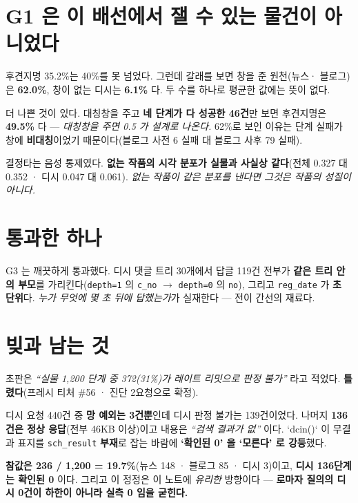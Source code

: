 \documentclass[10pt]{article}
\begin{document}
\section{G1 은 이 배선에서 잴 수 있는 물건이 아니었다}

후견지명 35.2\%는 40\%를 못 넘었다. 그런데 갈래를 보면 창을 준 원천(뉴스·
블로그)은 \textbf{62.0\%}, 창이 없는 디시는 \textbf{6.1\%} 다. 두 수를 하나로
평균한 값에는 뜻이 없다.

더 나쁜 것이 있다. 대칭창을 주고 \textbf{네 단계가 다 성공한 46건}만 보면
후견지명은 \textbf{49.5\%} 다 --- \emph{대칭창을 주면 0.5 가 설계로 나온다.}
62\%로 보인 이유는 단계 실패가 창에 \textbf{비대칭}이었기 때문이다(블로그
사전 6 실패 대 블로그 사후 79 실패).

결정타는 음성 통제였다. \textbf{없는 작품의 시각 분포가 실물과 사실상
같다}(전체 0.327 대 0.352 · 디시 0.047 대 0.061). \emph{없는 작품이 같은
분포를 낸다면 그것은 작품의 성질이 아니다.}


\section{통과한 하나}

G3 는 깨끗하게 통과했다. 디시 댓글 트리 30개에서 답글 119건 전부가
\textbf{같은 트리 안의 부모}를 가리킨다(\texttt{depth=1} 의 \texttt{c\_no} $\to$
\texttt{depth=0} 의 \texttt{no}), 그리고 \texttt{reg\_date} 가 \textbf{초
단위}다. \emph{누가 무엇에 몇 초 뒤에 답했는가}가 실재한다 --- 전이 간선의
재료다.

\section{빚과 남는 것}

초판은 \emph{``실물 1,200 단계 중 372(31\%)가 레이트 리밋으로 판정 불가''} 라고
적었다. \textbf{틀렸다}(프레시 티처 \#56 · 진단 2요청으로 확정).

디시 요청 440건 중 \textbf{망 예외는 3건뿐}인데 디시 판정 불가는 139건이었다.
나머지 \textbf{136건은 정상 응답}(전부 46KB 이상)이고 내용은 \emph{``검색 결과가
없''} 이다. `dcin()` 이 무결과 표지를 \texttt{sch\_result} \textbf{부재}로 잡는
바람에 \textbf{`확인된 0' 을 `모른다' 로 강등}했다.

\textbf{참값은 236 / 1,200 = 19.7\%}(뉴스 148 · 블로그 85 · 디시 3)이고,
\textbf{디시 136단계는 확인된 0} 이다. 그리고 이 정정은 이 노트에
\emph{유리한} 방향이다 --- \textbf{로마자 질의의 디시 0건이 하한이 아니라
실측 0 임을 굳힌다.}
\end{document}
